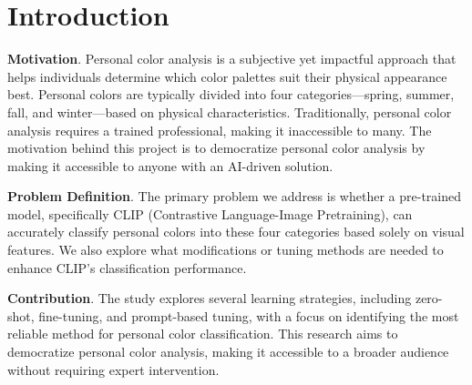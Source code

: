 \documentclass[twocolumn]{article}
\begin{document}

\vspace{1.5em}

\section{Introduction}
\textbf{Motivation}. Personal color analysis is a subjective yet impactful approach that helps individuals determine which color palettes suit their physical appearance best. Personal colors are typically divided into four categories—spring, summer, fall, and winter—based on physical characteristics. Traditionally, personal color analysis requires a trained professional, making it inaccessible to many. The motivation behind this project is to democratize personal color analysis by making it accessible to anyone with an AI-driven solution.

\textbf{Problem Definition}. The primary problem we address is whether a pre-trained model, specifically CLIP (Contrastive Language-Image Pretraining), can accurately classify personal colors into these four categories based solely on visual features. We also explore what modifications or tuning methods are needed to enhance CLIP's classification performance.

\textbf{Contribution}. The study explores several learning strategies, including zero-shot, fine-tuning, and prompt-based tuning, with a focus on identifying the most reliable method for personal color classification\cite{radford2021learning}. This research aims to democratize personal color analysis, making it accessible to a broader audience without requiring expert intervention.
\end{document}
